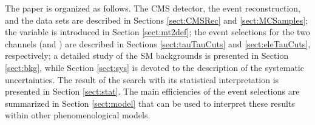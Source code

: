 The paper is organized as follows.  The CMS detector, the event reconstruction, and the data sets are described
in Sections \ref{sect:CMSRec} and \ref{sect:MCSamples}; the \mttwo variable is introduced in Section \ref{sect:mt2def}; 
the event selections for the two channels (\tauTau and \leptonTau)
are described in Sections \ref{sect:tauTauCuts} and \ref{sect:eleTauCuts}, respectively;
a detailed study of the SM backgrounds is presented in Section \ref{sect:bkg}, while Section \ref{sect:sys} 
is devoted to the description of the systematic uncertainties.  The result of the search with its statistical interpretation is presented in 
Section \ref{sect:stat}. The main efficiencies of the event selections are summarized in Section \ref{sect:model} that can be
used to interpret these results within other phenomenological models.



